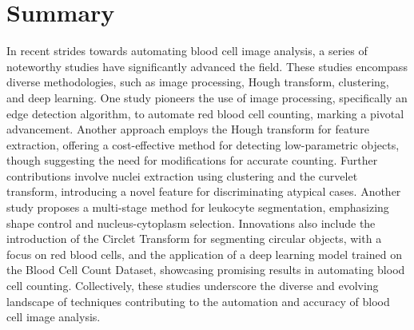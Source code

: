 \section{Summary} 
In recent strides towards automating blood cell image analysis, a series of noteworthy studies have significantly advanced the field. These studies encompass diverse methodologies, such as image processing, Hough transform, clustering, and deep learning. One study pioneers the use of image processing, specifically an edge detection algorithm, to automate red blood cell counting, marking a pivotal advancement. Another approach employs the Hough transform for feature extraction, offering a cost-effective method for detecting low-parametric objects, though suggesting the need for modifications for accurate counting. Further contributions involve nuclei extraction using clustering and the curvelet transform, introducing a novel feature for discriminating atypical cases. Another study proposes a multi-stage method for leukocyte segmentation, emphasizing shape control and nucleus-cytoplasm selection. Innovations also include the introduction of the Circlet Transform for segmenting circular objects, with a focus on red blood cells, and the application of a deep learning model \cite{bccd2020} trained on the Blood Cell Count Dataset, showcasing promising results in automating blood cell counting. Collectively, these studies underscore the diverse and evolving landscape of techniques contributing to the automation and accuracy of blood cell image analysis.